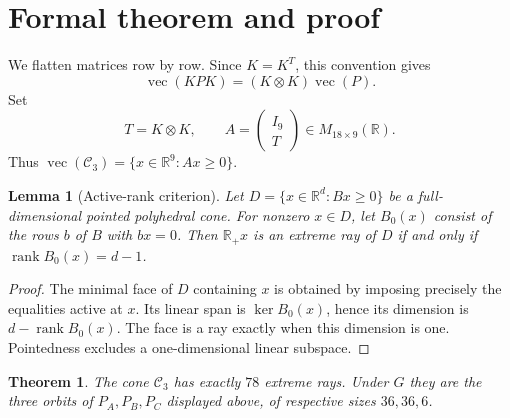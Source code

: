 \documentclass[11pt]{article}
\newtheorem{theorem}{Theorem}
\newtheorem{lemma}{Lemma}
\newcommand{\R}{\mathbb R}
\newcommand{\C}{\mathcal C}
\newcommand{\rank}{\operatorname{rank}}
\newcommand{\vecop}{\operatorname{vec}}
\begin{document}
\section*{Formal theorem and proof}

We flatten matrices row by row.  Since $K=K^T$, this convention gives
\[
 \vecop(KPK)=(K\otimes K)\vecop(P).
\]
Set
\[
 T=K\otimes K,\qquad
 A=\begin{pmatrix}I_9\\T\end{pmatrix}\in M_{18\times9}(\R).
\]
Thus $\vecop(\C_3)=\{x\in\R^9:Ax\geq0\}$.

\begin{lemma}[Active-rank criterion]\label{lem:rank}
Let $D=\{x\in\R^d:Bx\geq0\}$ be a full-dimensional pointed polyhedral cone.
For nonzero $x\in D$, let $B_0(x)$ consist of the rows $b$ of $B$ with
$bx=0$.  Then $\R_+x$ is an extreme ray of $D$ if and only if
$\rank B_0(x)=d-1$.
\end{lemma}

\begin{proof}
The minimal face of $D$ containing $x$ is obtained by imposing precisely the
equalities active at $x$.  Its linear span is $\ker B_0(x)$, hence its
dimension is $d-\rank B_0(x)$.  The face is a ray exactly when this dimension
is one.  Pointedness excludes a one-dimensional linear subspace.
\end{proof}

\begin{theorem}\label{thm:main}
The cone $\C_3$ has exactly $78$ extreme rays.  Under $G$ they are the three
orbits of $P_A,P_B,P_C$ displayed above, of respective sizes $36,36,6$.
\end{theorem}
\end{document}
